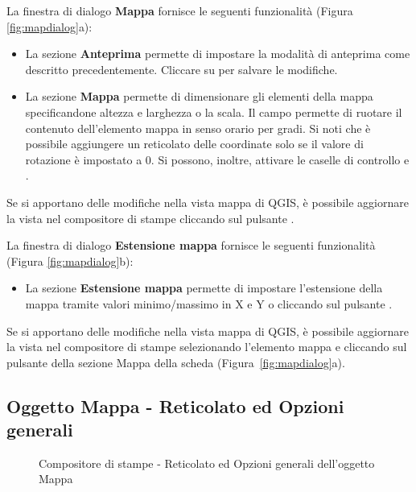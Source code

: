 
La finestra di dialogo \textbf{Mappa} fornisce le seguenti funzionalità (Figura \ref{fig:mapdialog}a):

\begin{itemize}[label=--]
\item La sezione \textbf{Anteprima} permette di impostare la modalità di anteprima come descritto 
precedentemente. Cliccare su  per salvare le modifiche.
\item La sezione \textbf{Mappa} permette di dimensionare gli elementi della mappa specificandone 
altezza e larghezza o la scala. Il campo  permette di ruotare il contenuto 
dell'elemento mappa in senso orario per gradi. Si noti che è possibile aggiungere un reticolato 
delle coordinate solo se il valore di rotazione è impostato a 0. Si possono, inoltre, attivare le 
caselle di controllo  e .
\end{itemize}

Se si apportano delle modifiche nella vista mappa di QGIS, è possibile aggiornare la vista nel 
compositore di stampe cliccando sul pulsante .


La finestra di dialogo \textbf{Estensione mappa} fornisce le seguenti funzionalità (Figura \ref{fig:mapdialog}b):

\begin{itemize}[label=--]
\item La sezione \textbf{Estensione mappa} permette di impostare l'estensione della mappa tramite 
valori minimo/massimo in X e Y o cliccando sul pulsante .
\end{itemize}

Se si apportano delle modifiche nella vista mappa di QGIS, è possibile aggiornare la vista nel 
compositore di stampe selezionando l'elemento mappa e cliccando sul pulsante  
della sezione Mappa della scheda  (Figura~\ref{fig:mapdialog}a).

\subsection{Oggetto Mappa - Reticolato ed Opzioni generali}

\begin{figure}[ht]
\centering
   \hspace{1cm}
   \caption{Compositore di stampe - Reticolato ed Opzioni generali dell'oggetto Mappa \nixcaption}\label{fig:sec_map_dialog}
\end{figure}

